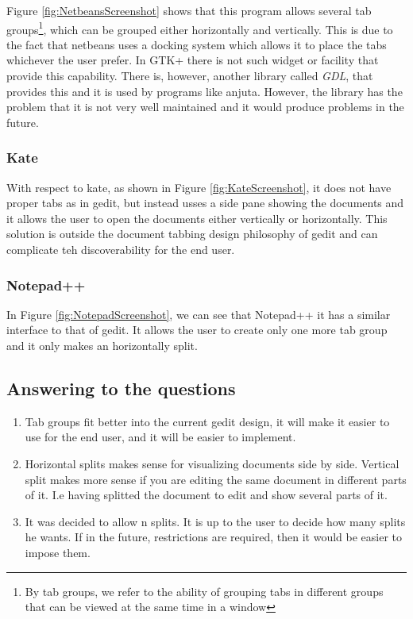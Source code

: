 Figure \ref{fig:NetbeansScreenshot} shows that this program allows several tab groups\footnote{By tab groups, we refer to the ability of grouping tabs in different groups that can be viewed at the same time in a window}, which can be grouped either horizontally and vertically. This is due to the fact that netbeans uses a docking system which allows it to place the tabs whichever the user prefer. In GTK+ there is not such widget or facility that provide this capability.  There is, however, another library called \emph{GDL},  that provides this and it is used by programs like anjuta.  However, the library has the problem that it is not very well maintained and it would produce problems in the future.

\subsubsection{Kate}

With respect to  kate,  as shown in Figure \ref{fig:KateScreenshot}, it does not have proper tabs as in gedit, but instead usses a side pane showing the documents and it allows the user to open the documents either vertically or horizontally. This solution is outside the document tabbing design philosophy of gedit and can complicate teh discoverability for the end user.

\subsubsection{Notepad++}

In Figure \ref{fig:NotepadScreenshot}, we can see that Notepad++ it has a similar interface to that of gedit. It allows the user to create only one more tab group and it only makes an horizontally split.

\newpage
{}


\newpage
{}

\subsection{Answering to the questions}

\begin{enumerate}
  \item Tab groups fit better into the  current gedit design, it will make it easier to use for the end user, and it will be easier to implement.
  \item Horizontal splits makes sense for visualizing documents side by side. Vertical split makes more sense if you are editing the same document in different parts of it. I.e having splitted the document to edit and show several parts of it.
  \item It was decided to allow n splits. It is up to the user to decide how many splits he wants. If in the future, restrictions are required, 
then it would be easier to impose them.
\end{enumerate}

